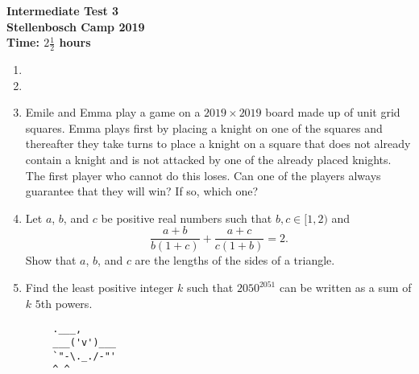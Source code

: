 \documentclass{article}
\begin{document}
	\thispagestyle{empty}
	
	\begin{center}
		\textbf{\Large Intermediate Test 3}
		\\ \vspace{1em}
		\textbf{\large Stellenbosch Camp 2019}
		\\ \vspace{1em}
		\textbf{\large Time: $2\frac{1}{2}$ hours}
	\end{center}
	
	\vspace{6.81mm}
	
	\begin{enumerate}[1.]
		\item
		\vspace{6.81mm}

		\item
		\vspace{6.81mm}

		\item %
		Emile and Emma play a game on a $2019 \times 2019$ board made up of unit grid squares. Emma plays first by placing a knight on one of the squares and thereafter they take turns to place a knight on a square that does not already contain a knight and is not attacked by one of the already placed knights. The first player who cannot do this loses. Can one of the players always guarantee that they will win? If so, which one? 
		\vspace{6.81mm}
		
		\item %
		Let $a$, $b$, and $c$ be positive real numbers such that $b, c \in [1,2)$ and
		\[ \frac{a+b}{b(1+c)} +\frac{a+c}{c(1+b)} = 2. \]
		Show that $a$, $b$, and $c$ are the lengths of the sides of a triangle.
		\vspace{6.81mm}

		\item %
		Find the least positive integer $k$ such that $2050^{2051}$ can be written as a sum of $k$ $5$th powers.

			
	\end{enumerate}
	
	
	\vfill
	\begin{center}
		\begin{BVerbatim}
		.___,   
		___('v')___
		`"-\._./-"'
		^ ^ 
		
		\end{BVerbatim}
	\end{center}
	
\end{document}
